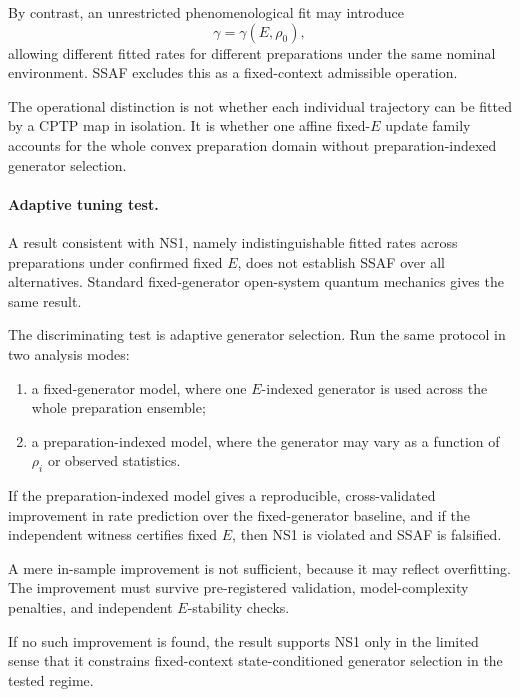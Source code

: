 \documentclass[aps,prx,onecolumn,11pt]{revtex4-2}
\theoremstyle{plain}
\theoremstyle{definition}
\theoremstyle{remark}
\begin{document}
By contrast, an unrestricted phenomenological fit may introduce
\begin{equation}
\gamma=\gamma(E,\rho_0),
\label{eq:state_conditioned_generator_selection}
\end{equation}
allowing different fitted rates for different preparations under the
same nominal environment. SSAF excludes this as a fixed-context
admissible operation.

The operational distinction is not whether each individual trajectory
can be fitted by a CPTP map in isolation. It is whether one affine
fixed-\(E\) update family accounts for the whole convex preparation
domain without preparation-indexed generator selection.

\paragraph{Adaptive tuning test.}

A result consistent with NS1, namely indistinguishable fitted rates
across preparations under confirmed fixed \(E\), does not establish
SSAF over all alternatives. Standard fixed-generator open-system
quantum mechanics gives the same result.

The discriminating test is adaptive generator selection. Run the same
protocol in two analysis modes:

\begin{enumerate}[label=(\roman*), leftmargin=2.2em]
\item a fixed-generator model, where one \(E\)-indexed generator is
used across the whole preparation ensemble;
\item a preparation-indexed model, where the generator may vary as a
function of \(\rho_i\) or observed statistics.
\end{enumerate}

If the preparation-indexed model gives a reproducible,
cross-validated improvement in rate prediction over the fixed-generator
baseline, and if the independent witness certifies fixed \(E\), then
NS1 is violated and SSAF is falsified.

A mere in-sample improvement is not sufficient, because it may reflect
overfitting. The improvement must survive pre-registered validation,
model-complexity penalties, and independent \(E\)-stability checks.

If no such improvement is found, the result supports NS1 only in the
limited sense that it constrains fixed-context state-conditioned
generator selection in the tested regime.
\end{document}
